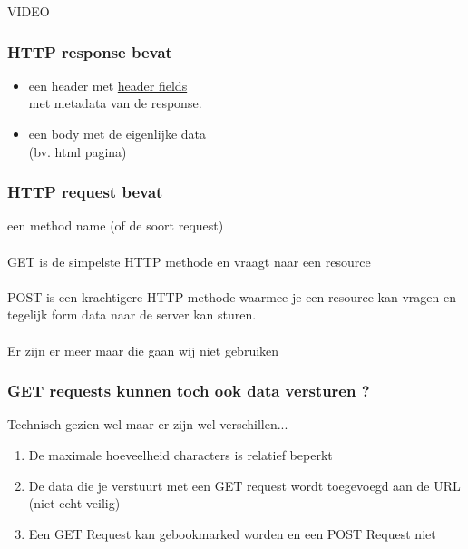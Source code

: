 \documentclass{beamer}
\begin{document}
\begin{frame}

\begin{center}
{\Huge VIDEO}
\end{center}

\end{frame}


\begin{frame}

\frametitle{HTTP response bevat}

{\LARGE \begin{itemize}
  \item een header met \href{https://en.wikipedia.org/wiki/List_of_HTTP_header_fields}{header fields} \\met metadata van de response.
  \item een body met de eigenlijke data \\(bv. html pagina)
\end{itemize}}

\end{frame}


\begin{frame}

\frametitle{HTTP request bevat}

{\Large een method name (of de soort request)\\~\\

GET is de simpelste HTTP methode en vraagt naar een resource\\~\\
POST is een krachtigere HTTP methode waarmee je een resource kan vragen en tegelijk form data naar de server kan sturen.\\~\\
Er zijn er meer maar die gaan wij niet gebruiken}

\end{frame}


\begin{frame}

\frametitle{GET requests kunnen toch ook data versturen ?}

{\Large Technisch gezien wel maar er zijn wel verschillen...

\begin{enumerate}
  \item De maximale hoeveelheid characters is relatief beperkt
  \item De data die je verstuurt met een GET request wordt toegevoegd aan de URL (niet echt veilig)
  \item Een GET Request kan gebookmarked worden en een POST Request niet
\end{enumerate}}

\end{frame}
\end{document}
